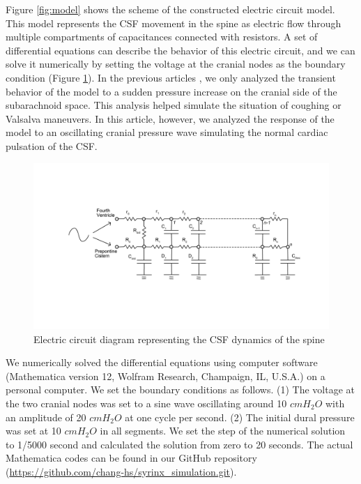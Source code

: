 \documentclass[fleqn,10pt]{wlscirep}
\begin{document}
Figure \ref{fig:model} shows the scheme of the constructed electric circuit
model. This model represents the CSF movement in the spine as electric flow
through multiple compartments of capacitances connected with resistors. A
set of differential equations can describe the behavior of this electric
circuit, and we can solve it numerically by setting the voltage at the
cranial nodes as the boundary condition (Figure \ref{fig:circuit}). In the
previous articles \cite{chang2003hypothesis, chang2004theoretical}, we only
analyzed the transient behavior of the model to a sudden pressure increase
on the cranial side of the subarachnoid space. This analysis helped
simulate the situation of coughing or Valsalva maneuvers. In this article,
however, we analyzed the response of the model to an oscillating cranial
pressure wave simulating the normal cardiac pulsation of the CSF.

\begin{figure}[ht]
    \centering
    \includegraphics[width=\textwidth]{electric_circuit_new.jpg}
    \caption{Electric circuit diagram representing the CSF dynamics of the spine}
    \label{fig:circuit}
\end{figure}

We numerically solved the differential equations using computer software
(Mathematica version 12, Wolfram Research, Champaign, IL, U.S.A.) on a
personal computer. We set the boundary conditions as follows. (1) The
voltage at the two cranial nodes was set to a sine wave oscillating around
10 $cmH_{2}O$ with an amplitude of 20 $cmH_{2}O$ at one cycle per second.
(2) The initial dural pressure was set at 10 $cmH_{2}O$ in all segments. We
set the step of the numerical solution to 1/5000 second and calculated the
solution from zero to 20 seconds. The actual Mathematica codes can be found
in our GitHub repository
(\url{https://github.com/chang-hs/syrinx_simulation.git}). 
\end{document}
